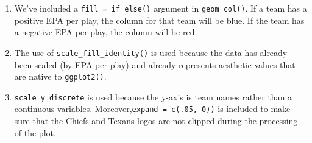 \documentclass[
  letterpaper,
]{krantz}
\providecommand{\tightlist}{%
  \setlength{\itemsep}{0pt}\setlength{\parskip}{0pt}}\usepackage{longtable,booktabs,array}
\begin{document}
\begin{enumerate}
\def\labelenumi{\arabic{enumi}.}
\tightlist
\item
  We've included a \texttt{fill\ =\ if\_else()} argument in
  \texttt{geom\_col()}. If a team has a positive EPA per play, the
  column for that team will be blue. If the team has a negative EPA per
  play, the column will be red.
\item
  The use of \texttt{scale\_fill\_identity()} is used because the data
  has already been scaled (by EPA per play) and already represents
  aesthetic values that are native to \texttt{ggplot2()}.
\item
  \texttt{scale\_y\_discrete} is used because the y-axis is team names
  rather than a continuous variables.
  Moreover,\texttt{expand\ =\ c(.05,\ 0))} is included to make sure that
  the Chiefs and Texans logos are not clipped during the processing of
  the plot.
\end{enumerate}
\end{document}

